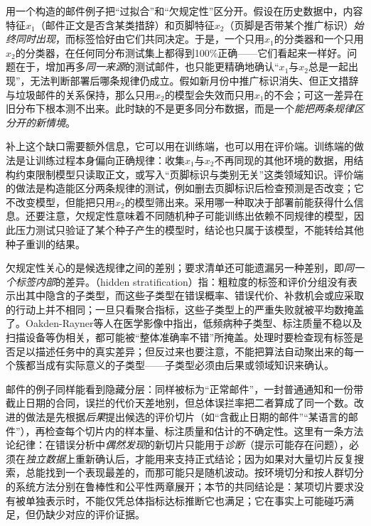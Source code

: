 用一个构造的邮件例子把“过拟合”和“欠规定性”区分开。假设在历史数据中，内容特征$x_1$（邮件正文是否含某类措辞）和页脚特征$x_2$（页脚是否带某个推广标识）\emph{始终同时出现}，而标签恰好由它们共同决定。于是，一个只用$x_1$的分类器和一个只用$x_2$的分类器，在任何同分布测试集上都得到100\%正确——它们看起来一样好。问题在于，增加再多\emph{同一来源}的测试邮件，也只能更精确地确认“$x_1$与$x_2$总是一起出现”，无法判断部署后哪条规律仍成立。假如新月份中推广标识消失、但正文措辞与垃圾邮件的关系保持，那么只用$x_2$的模型会失效而只用$x_1$的不会；可这一差异在旧分布下根本测不出来。此时缺的不是更多同分布数据，而是一个\emph{能把两条规律区分开的新情境}。

补上这个缺口需要额外信息，它可以用在训练端，也可以用在评价端。训练端的做法是让训练过程本身偏向正确规律：收集$x_1$与$x_2$不再同现的其他环境的数据，用结构约束限制模型只读取正文，或写入“页脚标识与类别无关”这类领域知识。评价端的做法是构造能区分两条规律的测试，例如删去页脚标识后检查预测是否改变；它不改变模型，但能把只用$x_2$的模型筛出来。采用哪一种取决于部署前能获得什么信息。还要注意，欠规定性意味着不同随机种子可能训练出依赖不同规律的模型，因此压力测试只验证了某个种子产生的模型时，结论也只属于该模型，不能转给其他种子重训的结果。

欠规定性关心的是候选规律之间的差别；要求清单还可能遗漏另一种差别，即\emph{同一个标签内部}的差异。（hidden stratification）指：粗粒度的标签和评价分组没有表示出其中隐含的子类型，而这些子类型在错误概率、错误代价、补救机会或应采取的行动上并不相同；一旦只看聚合指标，这些子类型上的严重失败就被平均数掩盖了。Oakden-Rayner等人在医学影像中指出，低频病种子类型、标注质量不稳以及扫描设备等伪相关，都可能被“整体准确率不错”所掩盖。处理时要检查现有标签是否足以描述任务中的真实差异；但反过来也要注意，不能把算法自动聚出来的每一个簇都当成有实际意义的子类型——子类型必须由后果或领域知识来确认。

邮件的例子同样能看到隐藏分层：同样被标为“正常邮件”，一封普通通知和一份带截止日期的合同，误拦的代价天差地别，但总体误拦率把二者算成了同一个数。改进的做法是先根据\emph{后果}提出候选的评价切片（如“含截止日期的邮件”“某语言的邮件”），再检查每个切片内的样本量、标注质量和估计的不确定性。这里有一条方法论纪律：在错误分析中\emph{偶然发现}的新切片只能用于\emph{诊断}（提示可能存在问题），必须在\emph{独立数据}上重新确认后，才能用来支持正式结论；因为如果对大量切片反复搜索，总能找到一个表现最差的，而那可能只是随机波动。按环境切分和按人群切分的系统方法分别在鲁棒性和公平性两章展开；本节的共同结论是：某项切片要求没有被单独表示时，不能仅凭总体指标达标推断它也满足；它在事实上可能碰巧满足，但仍缺少对应的评价证据。

